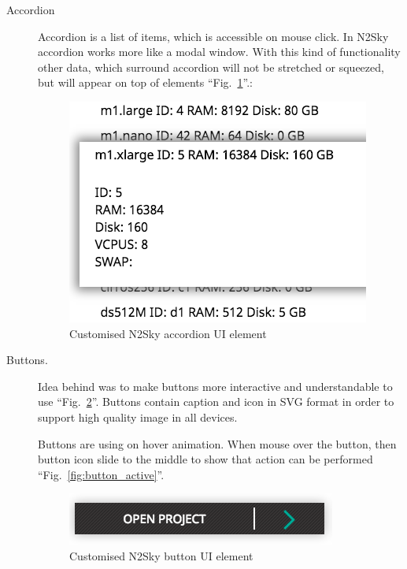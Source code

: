 \begin{description}
\item[Accordion]  Accordion is a list of items, which is accessible on mouse click. In N2Sky accordion works more like a modal window. With this kind of functionality other data, which surround accordion will not be stretched or squeezed, but will appear on top of elements ``Fig.~\ref{fig:accordion}''.: 

\begin{figure}[htbp]
\begin{center}
  \includegraphics[scale=0.75]{components/3/components/accordion.png}
  \caption{Customised N2Sky accordion UI element}
  \label{fig:accordion}
\end{center}
\end{figure}

\item[Buttons.] Idea behind was to make buttons more interactive and understandable to use ``Fig.~\ref{fig:button_inactive}''. Buttons contain caption and icon in SVG format in order to support high quality image in all devices.

Buttons are using on hover animation. When mouse over the button, then button icon slide to the middle to show that action can be performed ``Fig.~\ref{fig:button_active}''. 

\begin{figure}[htbp]
\begin{center}
  \includegraphics[scale=0.55]{components/3/components/button_inactive.png}
  \caption{Customised N2Sky button UI element}
  \label{fig:button_inactive}
\end{center}
\end{figure}



\end{description}
